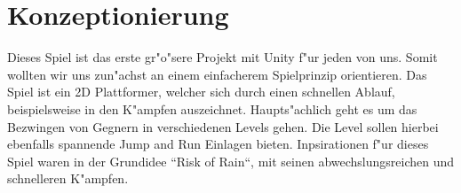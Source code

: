 \chapter{Konzeptionierung}
Dieses Spiel ist das erste gr"o"sere Projekt mit Unity f"ur jeden von uns. Somit wollten wir uns zun"achst an einem einfacherem Spielprinzip orientieren.
Das Spiel ist ein 2D Plattformer, welcher sich durch einen schnellen Ablauf, beispielsweise in den K"ampfen auszeichnet. Haupts"achlich geht es um das Bezwingen von Gegnern in verschiedenen Levels gehen. Die Level sollen hierbei ebenfalls spannende Jump and Run Einlagen bieten.
Inpsirationen f"ur dieses Spiel waren in der Grundidee ``Risk of Rain``, mit seinen abwechslungsreichen und schnelleren K"ampfen.

